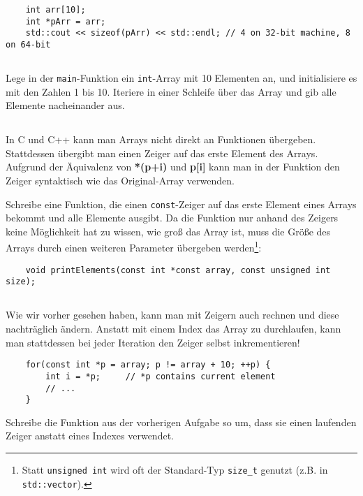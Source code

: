 \begin{lstlisting}
	int arr[10];
	int *pArr = arr;
	std::cout << sizeof(pArr) << std::endl; // 4 on 32-bit machine, 8 on 64-bit
\end{lstlisting}

\subsection{}
Lege in der \texttt{main}-Funktion ein \texttt{int}-Array mit 10 Elementen an, und initialisiere es mit den Zahlen 1 bis 10.
Iteriere in einer Schleife über das Array und gib alle Elemente nacheinander aus.

\subsection{}
In C und C++ kann man Arrays nicht direkt an Funktionen übergeben.
Stattdessen übergibt man einen Zeiger auf das erste Element des Arrays. Aufgrund der Äquivalenz von \textbf{*(p+i) } und \textbf{p[i]} kann man in der Funktion den Zeiger syntaktisch wie das Original-Array verwenden.

Schreibe eine Funktion, die einen \texttt{const}-Zeiger auf das erste Element eines Arrays bekommt und alle Elemente ausgibt.
Da die Funktion nur anhand des Zeigers keine Möglichkeit hat zu wissen, wie groß das Array ist, muss die Größe des Arrays durch einen weiteren Parameter übergeben werden\footnote{Statt \texttt{unsigned int} wird oft der Standard-Typ \texttt{size\_t} genutzt (z.B. in \texttt{std::vector}).}:

\begin{lstlisting}
	void printElements(const int *const array, const unsigned int size);
\end{lstlisting}

\subsection{}
Wie wir vorher gesehen haben, kann man mit Zeigern auch rechnen und diese nachträglich ändern.
Anstatt mit einem Index das Array zu durchlaufen, kann man stattdessen bei jeder Iteration den Zeiger selbst inkrementieren!

\begin{lstlisting}
	for(const int *p = array; p != array + 10; ++p) {
		int i = *p;		// *p contains current element
		// ...
	}
\end{lstlisting}

Schreibe die Funktion aus der vorherigen Aufgabe so um, dass sie einen laufenden Zeiger anstatt eines Indexes verwendet.

